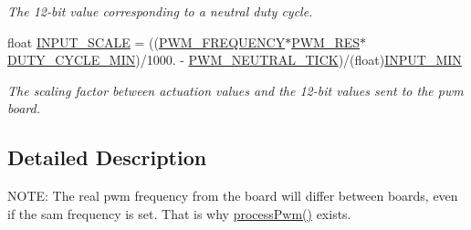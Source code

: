 \begin{DoxyCompactItemize}
\begin{DoxyCompactList}\small\item\em The 12-\/bit value corresponding to a neutral duty cycle. \end{DoxyCompactList}\item 
float \hyperlink{group__ActuationToOutput_ga8e7323c31db382601e81947c2bba345b}{I\+N\+P\+U\+T\+\_\+\+S\+C\+A\+LE} = ((\hyperlink{group__ActuationToOutput_ga1e7ca795ca78a0b20f4fbc06ea505cfb}{P\+W\+M\+\_\+\+F\+R\+E\+Q\+U\+E\+N\+CY}$\ast$\hyperlink{group__ActuationToOutput_ga3de5d6c408f667c395ab2b236e059724}{P\+W\+M\+\_\+\+R\+ES}$\ast$\hyperlink{group__ActuationToOutput_gadf577758fd2164217d18fb25c119c974}{D\+U\+T\+Y\+\_\+\+C\+Y\+C\+L\+E\+\_\+\+M\+IN})/1000. -\/ \hyperlink{group__ActuationToOutput_gaa6aecad7bb848a436df0b7c89aa1f48f}{P\+W\+M\+\_\+\+N\+E\+U\+T\+R\+A\+L\+\_\+\+T\+I\+CK})/(float)\hyperlink{group__ActuationToOutput_ga1f805f05ca679b7b28951bfa6659294d}{I\+N\+P\+U\+T\+\_\+\+M\+IN}\hypertarget{group__ActuationToOutput_ga8e7323c31db382601e81947c2bba345b}{}\label{group__ActuationToOutput_ga8e7323c31db382601e81947c2bba345b}

\begin{DoxyCompactList}\small\item\em The scaling factor between actuation values and the 12-\/bit values sent to the pwm board. \end{DoxyCompactList}\end{DoxyCompactItemize}


\subsection{Detailed Description}
N\+O\+TE\+: The real pwm frequency from the board will differ between boards, even if the sam frequency is set. That is why \hyperlink{svea__arduino__src_8h_af99fa97e441e842b197dacc4a1a95a99}{process\+Pwm()} exists. 